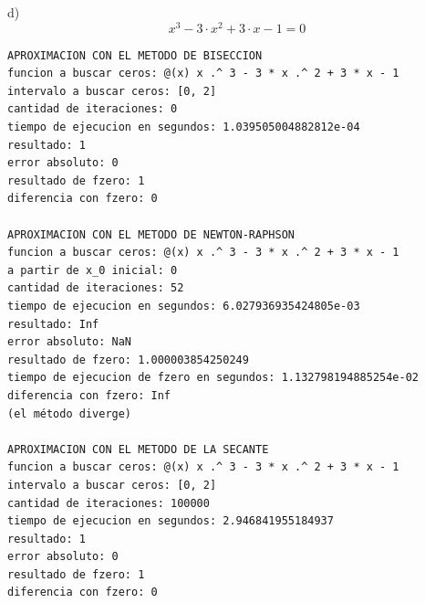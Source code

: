 \documentclass{article}
\begin{document}
d)
\[ x^{3} -3 \cdot x^{2} + 3 \cdot x - 1 = 0\]
\begin{lstlisting}
APROXIMACION CON EL METODO DE BISECCION
funcion a buscar ceros: @(x) x .^ 3 - 3 * x .^ 2 + 3 * x - 1
intervalo a buscar ceros: [0, 2]
cantidad de iteraciones: 0
tiempo de ejecucion en segundos: 1.039505004882812e-04
resultado: 1
error absoluto: 0
resultado de fzero: 1
diferencia con fzero: 0

APROXIMACION CON EL METODO DE NEWTON-RAPHSON
funcion a buscar ceros: @(x) x .^ 3 - 3 * x .^ 2 + 3 * x - 1
a partir de x_0 inicial: 0
cantidad de iteraciones: 52
tiempo de ejecucion en segundos: 6.027936935424805e-03
resultado: Inf
error absoluto: NaN
resultado de fzero: 1.000003854250249
tiempo de ejecucion de fzero en segundos: 1.132798194885254e-02
diferencia con fzero: Inf
(el método diverge)

APROXIMACION CON EL METODO DE LA SECANTE
funcion a buscar ceros: @(x) x .^ 3 - 3 * x .^ 2 + 3 * x - 1
intervalo a buscar ceros: [0, 2]
cantidad de iteraciones: 100000
tiempo de ejecucion en segundos: 2.946841955184937
resultado: 1
error absoluto: 0
resultado de fzero: 1
diferencia con fzero: 0
\end{lstlisting}
\end{document}
